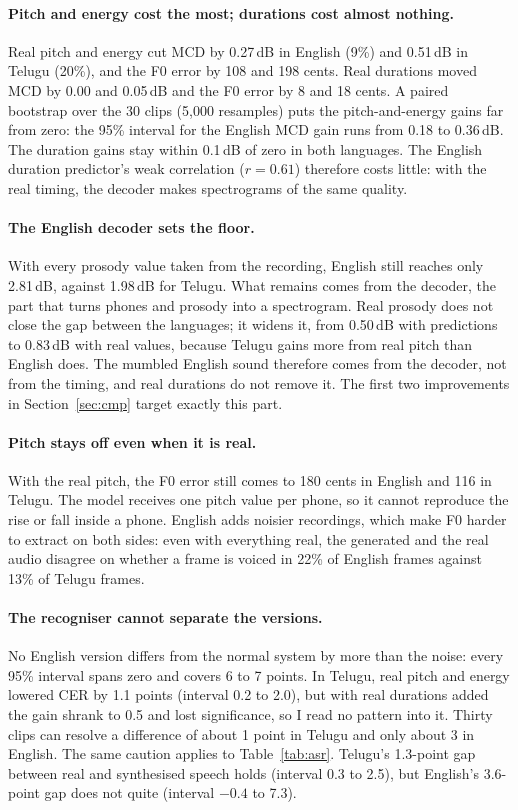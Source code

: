 \documentclass[11pt,a4paper]{article}
\begin{document}
\paragraph{Pitch and energy cost the most; durations cost almost nothing.} Real pitch and energy cut MCD by
0.27\,dB in English (9\%) and 0.51\,dB in Telugu (20\%), and the F0 error by 108 and 198 cents. Real durations
moved MCD by 0.00 and 0.05\,dB and the F0 error by 8 and 18 cents. A paired bootstrap over the 30 clips (5,000
resamples) puts the pitch-and-energy gains far from zero: the 95\% interval for the English MCD gain runs from
0.18 to 0.36\,dB. The duration gains stay within 0.1\,dB of zero in both languages. The English duration
predictor's weak correlation ($r = 0.61$) therefore costs little: with the real timing, the decoder makes
spectrograms of the same quality.

\paragraph{The English decoder sets the floor.} With every prosody value taken from the recording, English still
reaches only 2.81\,dB, against 1.98\,dB for Telugu. What remains comes from the decoder, the part that turns phones
and prosody into a spectrogram. Real prosody does not close the gap between the languages; it widens it, from
0.50\,dB with predictions to 0.83\,dB with real values, because Telugu gains more from real pitch than English
does. The mumbled English sound therefore comes from the decoder, not from the timing, and real durations do not
remove it. The first two improvements in Section~\ref{sec:cmp} target exactly this part.

\paragraph{Pitch stays off even when it is real.} With the real pitch, the F0 error still comes to 180 cents in
English and 116 in Telugu. The model receives one pitch value per phone, so it cannot reproduce the rise or fall
inside a phone. English adds noisier recordings, which make F0 harder to extract on both sides: even with
everything real, the generated and the real audio disagree on whether a frame is voiced in 22\% of English frames
against 13\% of Telugu frames.

\paragraph{The recogniser cannot separate the versions.} No English version differs from the normal system by
more than the noise: every 95\% interval spans zero and covers 6 to 7 points. In Telugu, real pitch and energy
lowered CER by 1.1 points (interval 0.2 to 2.0), but with real durations added the gain shrank to 0.5 and lost
significance, so I read no pattern into it. Thirty clips can resolve a difference of about 1 point in Telugu and
only about 3 in English. The same caution applies to Table~\ref{tab:asr}. Telugu's 1.3-point gap between real and
synthesised speech holds (interval 0.3 to 2.5), but English's 3.6-point gap does not quite (interval $-0.4$ to 7.3).
\end{document}
